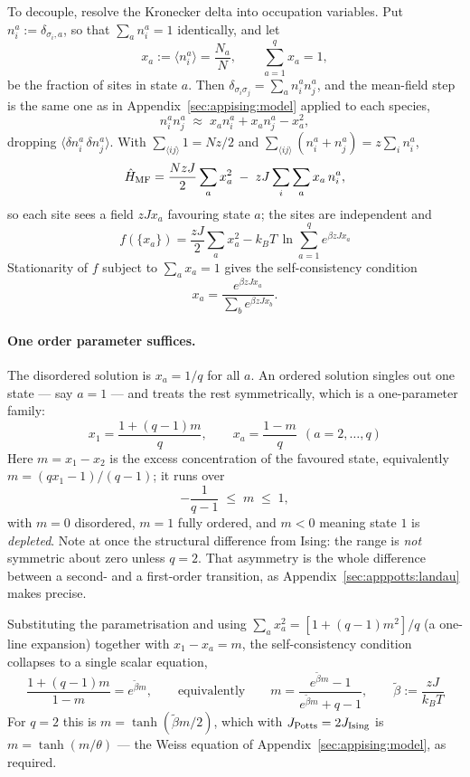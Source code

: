 \documentclass[10pt,a4paper]{article}
\theoremstyle{remark}
\begin{document}
To decouple, resolve the Kronecker delta into occupation variables. Put
$n_i^{a}:=\delta_{\sigma_i,a}$, so that $\sum_a n_i^{a}=1$ identically, and
let
\[
x_a:=\langle n_i^{a}\rangle=\frac{N_a}{N},\qquad \sum_{a=1}^{q}x_a=1 ,
\]
be the fraction of sites in state $a$. Then
$\delta_{\sigma_i\sigma_j}=\sum_a n_i^{a}n_j^{a}$, and the mean-field step is the
same one as in Appendix~\ref{sec:appising:model} applied to each species,
\[
n_i^{a}n_j^{a}\;\approx\;x_a n_i^{a}+x_a n_j^{a}-x_a^{2} ,
\]
dropping $\langle\delta n_i^a\,\delta n_j^a\rangle$. With
$\sum_{\langle ij\rangle}1=Nz/2$ and $\sum_{\langle ij\rangle}(n_i^a+n_j^a)=z\sum_i
n_i^a$,
\[
\hat H_{\rm MF}=\frac{NzJ}{2}\sum_a x_a^{2}\;-\;zJ\sum_i\sum_a x_a\,n_i^{a} ,
\]
so each site sees a field $zJx_a$ favouring state $a$; the sites are independent
and
\[
\;
f(\{x_a\})=\frac{zJ}{2}\sum_a x_a^{2}
-k_BT\,\ln\sum_{a=1}^{q}e^{\beta zJ x_a}\
\]
Stationarity of $f$ subject to $\sum_ax_a=1$ gives the self-consistency condition
\[
x_a=\frac{e^{\beta zJ x_a}}{\sum_b e^{\beta zJ x_b}} .
\]

\paragraph{One order parameter suffices.} The disordered solution is
$x_a=1/q$ for all $a$. An ordered solution singles out one state --- say $a=1$ ---
and treats the rest symmetrically, which is a one-parameter family:
\[
\;
x_1=\frac{1+(q-1)m}{q},\qquad
x_{a}=\frac{1-m}{q}\ \ (a=2,\dots,q)\
\]
Here $m=x_1-x_2$ is the excess concentration of the favoured state, equivalently
$m=(qx_1-1)/(q-1)$; it runs over
\[
-\frac{1}{q-1}\;\leq\;m\;\leq\;1 ,
\]
with $m=0$ disordered, $m=1$ fully ordered, and $m<0$ meaning state $1$ is
\emph{depleted}. Note at once the structural difference from Ising: the range is
\emph{not} symmetric about zero unless $q=2$. That asymmetry is the whole
difference between a second- and a first-order transition, as
Appendix~\ref{sec:apppotts:landau} makes precise.

Substituting the parametrisation and using $\sum_a x_a^2=[1+(q-1)m^2]/q$ (a
one-line expansion) together with $x_1-x_a=m$, the self-consistency condition
collapses to a single scalar equation,
\[
\;
\frac{1+(q-1)m}{1-m}=e^{\tilde\beta m},
\qquad\text{equivalently}\qquad
m=\frac{e^{\tilde\beta m}-1}{e^{\tilde\beta m}+q-1},
\qquad \tilde\beta:=\frac{zJ}{k_BT}\
\]
For $q=2$ this is $m=\tanh(\tilde\beta m/2)$, which with $J_{\rm
Potts}=2J_{\rm Ising}$ is $m=\tanh(m/\theta)$ --- the Weiss equation of
Appendix~\ref{sec:appising:model}, as required.
\end{document}
